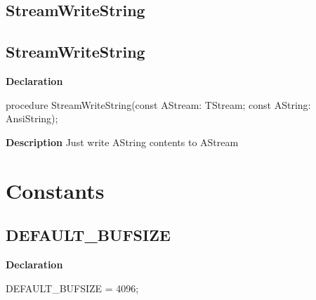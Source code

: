 \documentclass{report}
\newif\ifpdf
\begin{document}
\subsection*{\large{\textbf{StreamWriteString}}\normalsize\hspace{1ex}\hrulefill}
\else
\subsection*{StreamWriteString}
\fi
\label{PasDoc_StreamUtils-StreamWriteString}
\begin{list}{}{
\setlength{\itemindent}{0cm}
\setlength{\listparindent}{0cm}
\setlength{\leftmargin}{\evensidemargin}
\addtolength{\leftmargin}{\tmplength}
\settowidth{\labelsep}{X}
\addtolength{\leftmargin}{\labelsep}
\setlength{\labelwidth}{\tmplength}
}
\item[\textbf{Declaration}\hfill]
\ifpdf
\begin{flushleft}
\fi
\begin{ttfamily}
procedure StreamWriteString(const AStream: TStream; const AString: AnsiString);\end{ttfamily}

\ifpdf
\end{flushleft}
\fi

\par
\item[\textbf{Description}]
Just write AString contents to AStream

\end{list}
\section{Constants}
\ifpdf
\subsection*{\large{\textbf{DEFAULT{\_}BUFSIZE}}\normalsize\hspace{1ex}\hrulefill}
\else
\subsection*{DEFAULT{\_}BUFSIZE}
\fi
\label{PasDoc_StreamUtils-DEFAULT_BUFSIZE}
\begin{list}{}{
\setlength{\itemindent}{0cm}
\setlength{\listparindent}{0cm}
\setlength{\leftmargin}{\evensidemargin}
\addtolength{\leftmargin}{\tmplength}
\settowidth{\labelsep}{X}
\addtolength{\leftmargin}{\labelsep}
\setlength{\labelwidth}{\tmplength}
}
\item[\textbf{Declaration}\hfill]
\ifpdf
\begin{flushleft}
\fi
\begin{ttfamily}
DEFAULT{\_}BUFSIZE = 4096;\end{ttfamily}

\ifpdf
\end{flushleft}
\fi

\end{list}
\ifpdf
\end{document}
